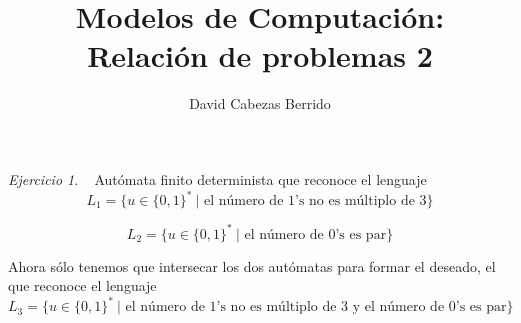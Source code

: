 \documentclass[12pt,spanish]{article}
\theoremstyle{definition}
\theoremstyle{remark}
\newtheorem{exercise}{Ejercicio}%
\begin{document}
\title{Modelos de Computación: \\ Relación de problemas 2}
\author{David Cabezas Berrido}
\date{\vspace{-5mm}}
\maketitle

\setcounter{exercise}{16}
\begin{exercise}~ Autómata finito determinista que reconoce el
  lenguaje
  \[L_1=\{u\in\{0,1\}^* \ | \text{ el número de 1's no es múltiplo de 3}\}\] \vspace{-10mm}
  \begin{figure}[H]
  \centering
\end{figure}
\vspace{-10mm}
  \[L_2=\{u\in\{0,1\}^* \ |\text{ el número de 0's es par}\}\] \vspace{-10mm}
  \begin{figure}[H]
  \centering
  \end{figure} \vspace{-5mm}
  Ahora sólo tenemos que intersecar los dos autómatas para formar el
  deseado, el que reconoce el lenguaje
  \[L_3=\{u\in\{0,1\}^* \ |\text{ el número de 1's no es múltiplo de 3 y el número de 0's es par}\}\]
  \begin{figure}[H]
  \centering
  \end{figure}
  
\end{exercise}
\end{document}
